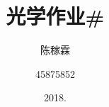 \documentclass[10pt,a4paper]{article}
\title{光学作业\#}
\author{陈稼霖 \and 45875852}
\date{2018.}
\begin{document}
\maketitle
\section*{}
\subsection*{}
\end{document}
